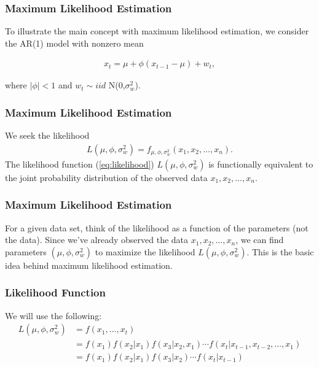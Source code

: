 \documentclass[%
xcolor=pdftex]{beamer}
\begin{document}
\begin{frame}
\frametitle{Maximum Likelihood Estimation}

To illustrate the main concept with maximum likelihood estimation, we consider the AR(1) model with nonzero mean

\begin{eqnarray}\label{eq:ar1}
x_t=\mu+\phi(x_{t-1}-\mu)+w_t,
\end{eqnarray}

where $|\phi|<1$ and $w_t\sim iid $ N(0,$\sigma^2_w$).

\end{frame}

\begin{frame}
\frametitle{Maximum Likelihood Estimation}

We seek the likelihood
\begin{eqnarray}\label{eq:likelihood}
L(\mu,\phi,\sigma^2_w) = f_{\mu,\phi,\sigma^2_w}(x_1,x_2,\ldots,x_n).
\end{eqnarray}
The likelihood function (\ref{eq:likelihood}) $L(\mu,\phi,\sigma^2_w)$ is functionally equivalent to the joint probability distribution of the observed data $x_1,x_2,\ldots,x_n$. 

\end{frame}

\begin{frame}
\frametitle{Maximum Likelihood Estimation}

For a given data set, think of the likelihood as a function of the parameters (not the data). Since we've already observed the data $x_1,x_2,\ldots,x_n$, we
can find parameters $(\mu,\phi,\sigma^2_w)$ to maximize the likelihood $L(\mu,\phi,\sigma^2_w)$. This is the basic idea behind maximum likelihood estimation.

\end{frame}


\begin{frame}
\frametitle{Likelihood Function}

We will use the following:
\begin{align*}
L(\mu,\phi,\sigma^2_w) &= f(x_1, \ldots, x_t) \\
&= f(x_1) f(x_2 | x_1) f(x_3 | x_2, x_1) \cdots f(x_t | x_{t-1}, x_{t-2}, \ldots, x_1) \\
&= f(x_1) f(x_2 | x_1) f(x_3 | x_2) \cdots f(x_t | x_{t-1}) 
\end{align*}


\end{frame}
\end{document}
